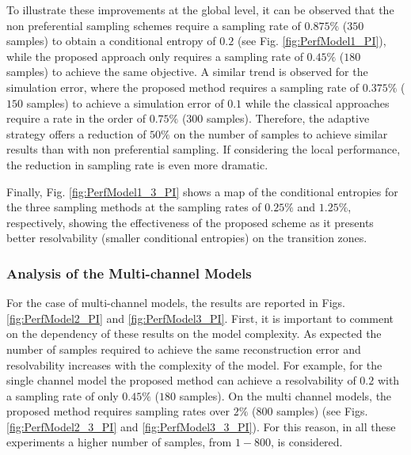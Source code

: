 To illustrate these improvements at the global level, it can be observed that the non preferential sampling schemes require a sampling rate of $0.875 \%$ ($350$ samples) to obtain a  conditional entropy of $0.2$ (see Fig. \ref{fig:PerfModel1_PI}), while the proposed approach only requires a sampling rate of $0.45 \%$ ($180$ samples) to achieve the same objective. A similar trend is observed for the simulation error, where the proposed method requires a sampling rate of $0.375 \%$ ($150$ samples) to achieve a simulation error of $0.1$ while the classical approaches require a rate in the order of $0.75 \%$  ($300$ samples). Therefore, the adaptive strategy offers a reduction of $50\%$ on the number of samples to achieve similar results than with non preferential sampling. If considering the local performance, the reduction in sampling rate is even more dramatic.

Finally, Fig. \ref{fig:PerfModel1_3_PI} shows a map of the conditional entropies for the three sampling methods at the sampling rates of $0.25 \%$ and $1.25 \%$, respectively, showing the effectiveness of the proposed scheme as it presents better resolvability (smaller conditional entropies) on the transition zones.

\subsubsection{Analysis of the Multi-channel Models}
For the case of multi-channel models, the results are reported in Figs. \ref{fig:PerfModel2_PI} and \ref{fig:PerfModel3_PI}.  First, it is important to comment on the dependency of these results on the model complexity. As expected the number of samples required to achieve the same reconstruction error and resolvability increases with the complexity of the model. For example,  for the single channel model the proposed method can achieve a resolvability of $0.2$ with a sampling rate of only $0.45 \%$ ($180$ samples). On the multi channel models, the proposed method requires sampling rates over $2 \%$ ($800$ samples) (see  Figs. \ref{fig:PerfModel2_3_PI} and \ref{fig:PerfModel3_3_PI}). For this reason, in all these experiments a higher number of samples, from $1-800$, is considered. 


